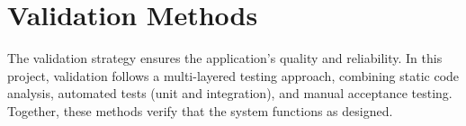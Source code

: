\section{Validation Methods}

The validation strategy ensures the application's quality and reliability. In this project, validation follows a multi-layered testing approach, combining static code analysis, automated tests (unit and integration), and manual acceptance testing. Together, these methods verify that the system functions as designed.



